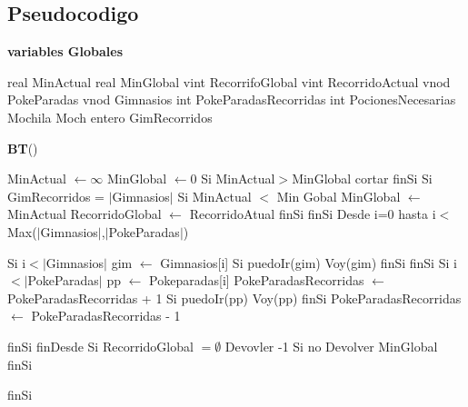 \documentclass[spanish,12pt]{article}
\begin{document}

\subsection{Pseudocodigo}

\begin{algorithm}[H]{\textbf{variables Globales}}
	\begin{algorithmic}[1]
		\State real MinActual 
		\State real MinGlobal
		\State vint RecorrifoGlobal
		\State vint RecorridoActual
		\State vnod PokeParadas
		\State vnod Gimnasios
		\State int PokeParadasRecorridas
		\State int PocionesNecesarias		
		\State Mochila Moch	
		\State entero GimRecorridos	
	
	\end{algorithmic}
\end{algorithm}

\begin{algorithm}[H]{\textbf{BT}()}
	\begin{algorithmic}[1]
		\State MinActual $\gets \infty$
		\State MinGlobal $\gets 0$
		\State Si  MinActual$>$MinGlobal  
			 \State \quad cortar
		\State finSi
		\State Si GimRecorridos = $|$Gimnasios$|$ 
		\State \quad Si MinActual $<$ Min Gobal
		\State \qquad MinGlobal $\gets$ MinActual
		\State \qquad RecorridoGlobal $\gets$ RecorridoAtual
		\State \quad finSi
		\State finSi
		\State Desde i=0 hasta i$<$Max($|$Gimnasios$|$,$|$PokeParadas$|$)
	
		\State \quad Si i$< |$Gimnasios$|$
		\State \quad \quad gim $\gets$ Gimnasios[i]
		\State \quad \quad Si puedoIr(gim)
		\State \quad \quad \quad Voy(gim)
 		\State \quad \quad finSi	
		\State \quad finSi
		\State \quad Si i $< |$PokeParadas$|$
		\State \qquad pp $\gets$ Pokeparadas[i]
		\State \qquad PokeParadasRecorridas $\gets$ PokeParadasRecorridas + 1 
		\State \qquad Si puedoIr(pp)
		\State \qquad \quad Voy(pp) 	
		\State \qquad finSi
		\State \qquad PokeParadasRecorridas $\gets$ PokeParadasRecorridas - 1 

		\State \quad finSi 
		\State finDesde
		\State Si RecorridoGlobal $= \emptyset$
		\State \quad Devovler -1
		\State Si no
		\State \quad Devolver MinGlobal
		\State finSi
  		
		
		
		\State finSi %
	\end{algorithmic}
\end{algorithm}
\end{document}
